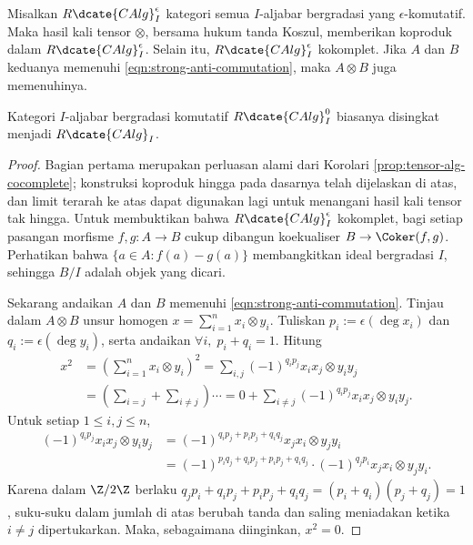 \begin{proposition}\label{prop:graded-alg-cocomplete}
	Misalkan $R\dcate{CAlg}^\epsilon_I$ kategori semua $I$-aljabar bergradasi yang $\epsilon$-komutatif. Maka hasil kali tensor $\otimes$, bersama hukum tanda Koszul, memberikan koproduk dalam $R\dcate{CAlg}^\epsilon_I$. Selain itu, $R\dcate{CAlg}^\epsilon_I$ kokomplet. Jika $A$ dan $B$ keduanya memenuhi \eqref{eqn:strong-anti-commutation}, maka $A \otimes B$ juga memenuhinya.
\end{proposition}
Kategori $I$-aljabar bergradasi komutatif $R\dcate{CAlg}^0_I$ biasanya disingkat menjadi $R\dcate{CAlg}_I$.
\begin{proof}
	Bagian pertama merupakan perluasan alami dari Korolari \ref{prop:tensor-alg-cocomplete}; konstruksi koproduk hingga pada dasarnya telah dijelaskan di atas, dan limit terarah ke atas dapat digunakan lagi untuk menangani hasil kali tensor tak hingga. Untuk membuktikan bahwa $R\dcate{CAlg}^\epsilon_I$ kokomplet, bagi setiap pasangan morfisme $f,g: A \to B$ cukup dibangun koekualiser $B \to \Coker(f,g)$. Perhatikan bahwa $\{a \in A:f(a)-g(a) \}$ membangkitkan ideal bergradasi $I$, sehingga $B/I$ adalah objek yang dicari.
	
	Sekarang andaikan $A$ dan $B$ memenuhi \eqref{eqn:strong-anti-commutation}. Tinjau dalam $A \otimes B$ unsur homogen $x = \sum_{i=1}^n x_i \otimes y_i$. Tuliskan $p_i := \epsilon(\deg x_i)$ dan $q_i := \epsilon(\deg y_i)$, serta andaikan $\forall i,\; p_i+q_i=1$. Hitung
	\begin{align*}
		x^2 & = \left( \sum_{i=1}^n x_i \otimes y_i \right)^2 = \sum_{i,j} (-1)^{q_i p_j} x_i x_j \otimes y_i y_j \\
		& = \left( \sum_{i=j} + \sum_{i \neq j} \right) \cdots
		= 0 + \sum_{i \neq j} (-1)^{q_i p_j} x_i x_j \otimes y_i y_j.
	\end{align*}
	Untuk setiap $1 \leq i,j \leq n$,
	\begin{align*}
		(-1)^{q_i p_j} x_i x_j \otimes y_i y_j & = (-1)^{q_i p_j + p_i p_j + q_i q_j} x_j x_i \otimes y_j y_i \\
		& = (-1)^{p_i q_j + q_i p_j + p_i p_j + q_i q_j} \cdot (-1)^{q_j p_i} x_j x_i \otimes y_j y_i.
	\end{align*}
	Karena dalam $\Z/2\Z$ berlaku $q_j p_i + q_i p_j + p_i p_j + q_i q_j = (p_i + q_i)(p_j + q_j) = 1$, suku-suku dalam jumlah di atas berubah tanda dan saling meniadakan ketika $i \neq j$ dipertukarkan. Maka, sebagaimana diinginkan, $x^2=0$.
\end{proof}

